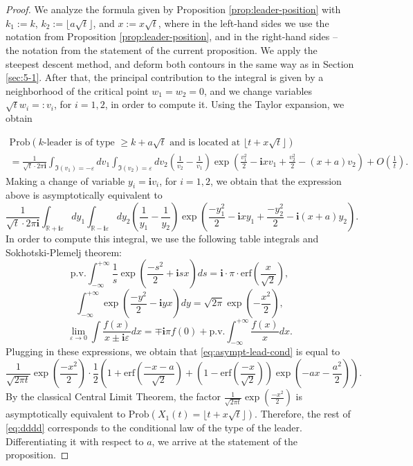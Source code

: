 \documentclass[11pt,reqno]{amsart}
\theoremstyle{definition}
\theoremstyle{remark}
\theoremstyle{remark}
\def\geq{\geqslant}
\renewcommand\ge{\geq}
\def\R{\mathbb R}
\newcommand{\eps}{\varepsilon}
\newcommand{\ii}{{\mathbf i}}
\numberwithin{equation}{section}
\begin{document}
	\begin{proof}
		We analyze the formula given by Proposition \ref{prop:leader-position} with $k_1 :=k$, $k_2 := \lfloor a \sqrt{t} \rfloor$, and $x := x \sqrt{t}$, where in the left-hand sides we use the notation from Proposition \ref{prop:leader-position}, and in the right-hand sides -- the notation from the statement of the current proposition. We apply the steepest descent method, and deform both contours in the same way as in Section \ref{sec:5-1}. After that, the principal contribution to the integral is given by a neighborhood of the critical point $w_1=w_2=0$, and we change variables $\sqrt{t} w_i =:v_i$, for $i=1,2$, in order to compute it. Using the Taylor expansion, we obtain
		
		\begin{multline}
			\mathrm{Prob} \left( \mbox{$k$-leader is of type $\ge k +a \sqrt{t}$ and is located at $\lfloor t + x \sqrt{t} \rfloor$} \right) \\ = \frac{1}{\sqrt{t} \cdot 2 \pi \ii} \int_{\Im (v_1) = - \eps } d v_1 \int_{\Im (v_2)= \eps } d v_2 
			\left( \frac{1}{v_2} - \frac{1}{v_1} \right) \exp \left( \frac{v_1^2}{2} - \ii x v_1 + \frac{v_2^2}{2} - (x+a) v_2 \right) + O \left( \frac{1}{t} \right).
		\end{multline} 
		Making a change of variable $y_i = \ii v_i$, for $i=1,2$, we obtain that the expression above is asymptotically equivalent to 
		\begin{equation}
			\label{eq:asympt-lead-cond}
			\frac{1}{\sqrt{t} \cdot 2 \pi \ii} \int_{\R + \ii \eps } d y_1 \int_{\R - \ii \eps } d y_2 
			\left( \frac{1}{y_1} - \frac{1}{y_2} \right) \exp \left( \frac{-y_1^2}{2} - \ii x y_1 + \frac{-y_2^2}{2} - \ii (x+a) y_2 \right).
		\end{equation}
		In order to compute this integral, we use the following table integrals and Sokhotski-Plemelj theorem:
		$$
		\mathrm{p.v.} \int_{-\infty}^{+\infty} \frac{1}{s} \exp \left( \frac{-s^2}{2} + \ii s x \right) ds
		= \ii \cdot \pi \cdot \mathrm{erf}\left( \frac{x}{\sqrt{2}} \right),
		$$
		$$
		\int_{-\infty}^{+\infty} \exp \left( \frac{-y^2}{2} - \ii y x \right) dy = \sqrt{2 \pi} \exp \left( - \frac{x^2}{2} \right),
		$$
		$$
		\lim_{\eps \to 0} \int \frac{f(x)}{x \pm \ii \eps} dx = \mp \ii \pi f(0) + \mathrm{p.v.} \int_{-\infty}^{+\infty} \frac{f(x)}{x} dx. 
		$$
		Plugging in these expressions, we obtain that \eqref{eq:asympt-lead-cond} is equal to
		\begin{equation}
			\label{eq:dddd}
			\frac{1}{\sqrt{2 \pi t}} \exp \left( \frac{-x^2}{2} \right) \cdot \frac{1}{2} \left( 1 + \mathrm{erf} \left( \frac{-x-a}{\sqrt{2}} \right) + \left( 1 - \mathrm{erf} \left( \frac{-x}{\sqrt{2}} \right) \right) \exp \left( - ax - \frac{a^2}{2} \right) \right).
		\end{equation}
		By the classical Central Limit Theorem, the factor $\frac{1}{\sqrt{2 \pi t}} \exp \left( \frac{-x^2}{2} \right)$ is asymptotically equivalent to $\mathrm{Prob} \left( X_1 (t) = \lfloor t + x \sqrt{t} \rfloor \right)$. Therefore, the rest of \eqref{eq:dddd} corresponds to the conditional law of the type of the leader. Differentiating it with respect to $a$, we arrive at the statement of the proposition. 
	\end{proof}
	
\end{document}
